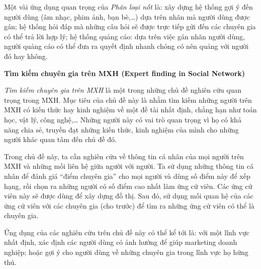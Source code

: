 \documentclass[12pt]{extarticle}
\begin{document}
			\par Một vài ứng dụng quan trọng của \textit{Phân loại nốt} là: xây dựng hệ thống gợi ý đến người dùng (âm nhạc, phim ảnh, bạn bè,…) dựa trên nhãn mà người dùng được gán; hệ thống hỏi đáp mà những câu hỏi sẽ được trực tiếp gửi đến các chuyên gia có thể trả lời hợp lý; hệ thống quảng cáo: dựa trên việc gán nhãn người dùng, người quảng cáo có thể đưa ra quyết định nhanh chóng có nên quảng với người đó hay không.
			\par \textbf{Tìm kiếm chuyên gia trên MXH (Expert finding in Social Network)}
			\par \textit{Tìm kiếm chuyên gia trên MXH} là một trong những chủ đề nghiên cứu quan trọng trong MXH. Mục tiêu của chủ đề này là nhằm tìm kiếm những người trên MXH có kiến thức hay kinh nghiệm về một đề tài nhất định, chẳng hạn như toán học, vật lý, công nghệ,… Những người này có vai trò quan trọng vì họ có khả năng chia sẻ, truyền đạt những kiến thức, kinh nghiệm của mình cho những người khác quan tâm đến chủ đề đó.
			\par Trong chủ đề này, ta cần nghiên cứu về thông tin cá nhân của mọi người trên MXH và những mối liên hệ giữa người với người. Ta sử dụng những thông tin cá nhân để đánh giá “điểm chuyên gia” cho mọi người và dùng số điểm này để xếp hạng, rồi chọn ra những người có số điểm cao nhất làm ứng cử viên. Các ứng cử viên này sẽ được dùng để xây dựng đồ thị. Sau đó, sử dụng mối quan hệ của các ứng cử viên với các chuyên gia (cho trước) để tìm ra những ứng cử viên có thể là chuyên gia.
			\par Ứng dụng của các nghiên cứu trên chủ đề này có thể kể tới là: với một lĩnh vực nhất định, xác định các người dùng có ảnh hưởng để giúp marketing doanh nghiệp; hoặc gợi ý cho người dùng về những chuyên gia trong lĩnh vực họ hứng thú.
			
\end{document}
